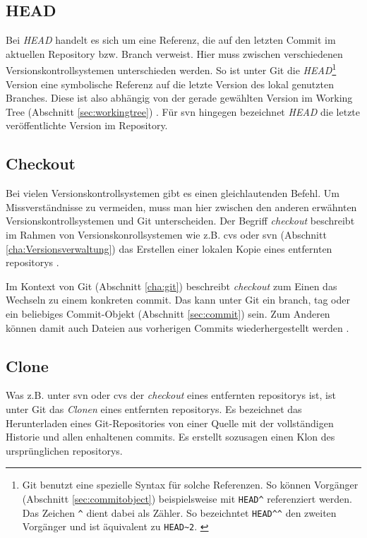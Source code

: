\subsection{HEAD}\label{sec:head}
Bei \textit{HEAD} handelt es sich um eine Referenz, die auf den letzten Commit
im aktuellen Repository bzw. Branch verweist. Hier muss zwischen verschiedenen
Versionskontrollsystemen unterschieden werden. So ist unter Git die
\textit{HEAD}\footnote{Git benutzt eine spezielle Syntax für solche Referenzen.
So können Vorgänger (Abschnitt \ref{sec:commitobject}) beispielsweise mit
\texttt{HEAD\^{}} referenziert werden. Das Zeichen \texttt{\^{}} dient dabei
als Zähler. So bezeichntet \texttt{HEAD\^{}\^{}} den zweiten Vorgänger und ist
äquivalent zu \texttt{HEAD\~{}2}. \cite[S.~65]{gitosp}} Version eine
symbolische Referenz auf die letzte Version des lokal genutzten Branches. Diese
ist also abhängig von der gerade gewählten Version im Working Tree (Abschnitt
\ref{sec:workingtree}) \cite[S.~20]{gitosp}. Für \acrshort{svn} hingegen
bezeichnet \textit{HEAD} die letzte veröffentlichte Version im Repository.

\subsection{Checkout}\label{sec:checkout}
Bei vielen Versionskontrollsystemen gibt es einen gleichlautenden Befehl.
Um Missverständnisse zu vermeiden, muss man hier zwischen den anderen erwähnten
Versionskontrollsystemen und Git unterscheiden. Der Begriff \textit{checkout}
beschreibt im Rahmen von Versionskonrollsystemen wie z.B. \acrshort{cvs} oder
\acrshort{svn} (Abschnitt \ref{cha:Versionsverwaltung}) das Erstellen einer
lokalen Kopie eines entfernten \glspl{repository} \cite[S~137]{gitosp}.

Im Kontext von Git (Abschnitt \ref{cha:git}) beschreibt \textit{checkout} zum
Einen das Wechseln zu einem konkreten \gls{commit}. Das kann unter Git ein
\gls{branch}, \gls{tag} oder ein beliebiges Commit-Objekt (Abschnitt
\ref{sec:commit}) sein. Zum Anderen können damit auch Dateien aus vorherigen
Commits wiederhergestellt werden \cite[S~76]{gitosp}.

\subsection{Clone}\label{sec:clone}
Was z.B. unter \acrshort{svn} oder \acrshort{cvs} der \textit{checkout} eines
entfernten \glspl{repository} ist, ist unter Git das \textit{Clonen} eines
entfernten \glspl{repository}. Es bezeichnet das Herunterladen eines
Git-Repositories von einer Quelle mit der vollständigen Historie und allen
enhaltenen \glspl{commit}. Es erstellt sozusagen einen Klon des
ursprünglichen \glspl{repository}. \cite[S.~21]{gitosp}

